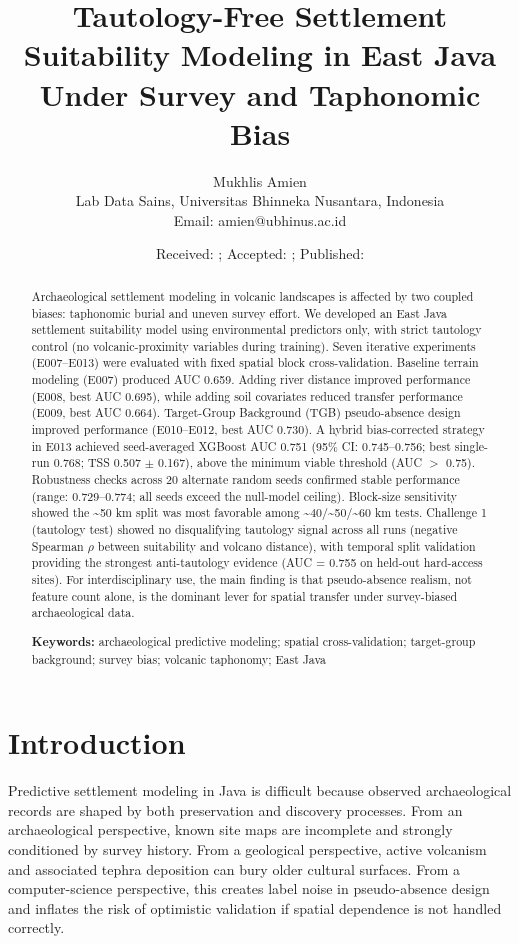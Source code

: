 \documentclass[12pt]{article}
\title{Tautology-Free Settlement Suitability Modeling in East Java Under Survey and Taphonomic Bias}
\author{Mukhlis Amien\\
Lab Data Sains, Universitas Bhinneka Nusantara, Indonesia\\
Email: amien@ubhinus.ac.id}
\date{Received: ; Accepted: ; Published: }
\begin{document}
\maketitle

\begin{abstract}
Archaeological settlement modeling in volcanic landscapes is affected by two coupled biases: taphonomic burial and uneven survey effort.
We developed an East Java settlement suitability model using environmental predictors only, with strict tautology control (no volcanic-proximity variables during training).
Seven iterative experiments (E007--E013) were evaluated with fixed spatial block cross-validation.
Baseline terrain modeling (E007) produced AUC 0.659.
Adding river distance improved performance (E008, best AUC 0.695), while adding soil covariates reduced transfer performance (E009, best AUC 0.664).
Target-Group Background (TGB) pseudo-absence design improved performance (E010--E012, best AUC 0.730).
A hybrid bias-corrected strategy in E013 achieved seed-averaged XGBoost AUC 0.751 (95\% CI: 0.745--0.756; best single-run 0.768; TSS 0.507 $\pm$ 0.167), above the minimum viable threshold (AUC $>$ 0.75).
Robustness checks across 20 alternate random seeds confirmed stable performance (range: 0.729--0.774; all seeds exceed the null-model ceiling).
Block-size sensitivity showed the \textasciitilde{}50 km split was most favorable among \textasciitilde{}40/\textasciitilde{}50/\textasciitilde{}60 km tests.
Challenge 1 (tautology test) showed no disqualifying tautology signal across all runs (negative Spearman $\rho$ between suitability and volcano distance), with temporal split validation providing the strongest anti-tautology evidence (AUC = 0.755 on held-out hard-access sites).
For interdisciplinary use, the main finding is that pseudo-absence realism, not feature count alone, is the dominant lever for spatial transfer under survey-biased archaeological data.

\vspace{0.5cm}
\noindent\textbf{Keywords:} archaeological predictive modeling; spatial cross-validation; target-group background; survey bias; volcanic taphonomy; East Java
\end{abstract}

\section{Introduction}

Predictive settlement modeling in Java is difficult because observed archaeological records are shaped by both preservation and discovery processes.
From an archaeological perspective, known site maps are incomplete and strongly conditioned by survey history.
From a geological perspective, active volcanism and associated tephra deposition can bury older cultural surfaces.
From a computer-science perspective, this creates label noise in pseudo-absence design and inflates the risk of optimistic validation if spatial dependence is not handled correctly.
\end{document}
